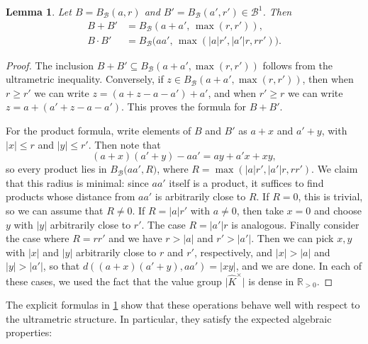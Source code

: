 \documentclass[10pt]{article}
\newtheorem{lemma}[theorem]{Lemma}
\theoremstyle{definition}
\newcommand{\RR}{\mathbb{R}}
\begin{document}
\begin{lemma}
  \label{lem:algebraDefinition}
  Let $B=B_{\mathcal{B}}(a,r)$ and $B'=B_{\mathcal{B}}(a',r')\in \mathcal B^1$. Then
  \begin{align*}
    B+B' &= B_{\mathcal{B}}(a+a',\, \max(r,r')),\\
    B\cdot B' &= B_{\mathcal{B}}\big(aa',\, \max(|a|r',|a'|r,rr')\big).
  \end{align*}
\end{lemma}
\begin{proof}
The inclusion $B+B'\subseteq B_{\mathcal{B}}(a+a',\max(r,r'))$ follows from the ultrametric inequality. 
Conversely, if $z\in B_{\mathcal{B}}(a+a',\max(r,r'))$, then when $r\geq r'$ we can write $z=(a+z-a-a')+a'$, and when $r'\geq r$ we can write $z=a+(a'+z-a-a')$. 
This proves the formula for $B+B'$.

For the product formula, write elements of $B$ and $B'$ as $a+x$ and $a'+y$, with $|x|\leq r$ and $|y|\leq r'$. 
Then note that
$$
  (a+x)(a'+y)-aa'=ay+a'x+xy,
$$
so every product lies in $B_{\mathcal{B}}\big(aa',R\big)$, where $R=\max(|a|r',|a'|r,rr')$. 
We claim that this radius is minimal: since $aa'$ itself is a product, it suffices to find products whose distance from $aa'$ is arbitrarily close to $R$. 
If $R=0$, this is trivial, so we can assume that $R \ne 0$.
If $R=|a|r'$ with $a\neq 0$, then take $x=0$ and choose $y$ with $|y|$ arbitrarily close to $r'$. 
The case $R=|a'|r$ is analogous. 
Finally consider the case where $R=rr'$ and we have $r>|a|$ and $r'>|a'|$. 
Then we can pick $x,y$ with $|x|$ and $|y|$ arbitrarily close to $r$ and $r'$, respectively, and $|x|>|a|$ and $|y|>|a'|$, so that
$d((a+x)(a'+y),aa') = \lvert x y \rvert$, and we are done.
In each of these cases, we used the fact that the value group $\lvert \hat K ^ \times \rvert$ is dense in $\RR_{>0}$.
\end{proof}

The explicit formulas in \cref{lem:algebraDefinition} show that these operations behave well with respect to the ultrametric structure. In particular, they satisfy the expected algebraic properties:
\end{document}
